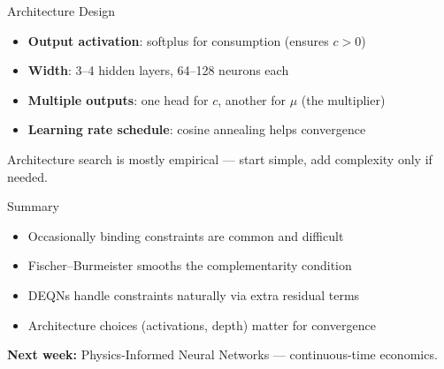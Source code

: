 \documentclass[aspectratio=169, 10pt]{beamer}
\begin{document}
\begin{frame}{Architecture Design}
\begin{itemize}
\item \textbf{Output activation}: softplus for consumption (ensures $c > 0$)
\item \textbf{Width}: 3--4 hidden layers, 64--128 neurons each
\item \textbf{Multiple outputs}: one head for $c$, another for $\mu$ (the multiplier)
\item \textbf{Learning rate schedule}: cosine annealing helps convergence
\end{itemize}

\bigskip
Architecture search is mostly empirical --- start simple, add complexity only if needed.
\end{frame}

\begin{frame}{Summary}
\begin{itemize}
\item Occasionally binding constraints are common and difficult
\item Fischer--Burmeister smooths the complementarity condition
\item DEQNs handle constraints naturally via extra residual terms
\item Architecture choices (activations, depth) matter for convergence
\end{itemize}

\bigskip
\textbf{Next week:} Physics-Informed Neural Networks --- continuous-time economics.
\end{frame}
\end{document}
